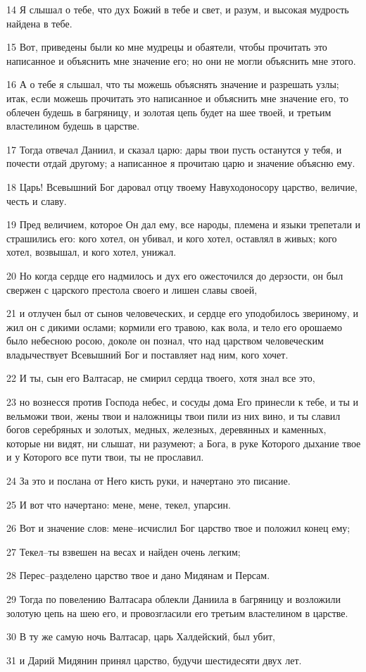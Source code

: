 \par 14 Я слышал о тебе, что дух Божий в тебе и свет, и разум, и высокая мудрость найдена в тебе.
\par 15 Вот, приведены были ко мне мудрецы и обаятели, чтобы прочитать это написанное и объяснить мне значение его; но они не могли объяснить мне этого.
\par 16 А о тебе я слышал, что ты можешь объяснять значение и разрешать узлы; итак, если можешь прочитать это написанное и объяснить мне значение его, то облечен будешь в багряницу, и золотая цепь будет на шее твоей, и третьим властелином будешь в царстве.
\par 17 Тогда отвечал Даниил, и сказал царю: дары твои пусть останутся у тебя, и почести отдай другому; а написанное я прочитаю царю и значение объясню ему.
\par 18 Царь! Всевышний Бог даровал отцу твоему Навуходоносору царство, величие, честь и славу.
\par 19 Пред величием, которое Он дал ему, все народы, племена и языки трепетали и страшились его: кого хотел, он убивал, и кого хотел, оставлял в живых; кого хотел, возвышал, и кого хотел, унижал.
\par 20 Но когда сердце его надмилось и дух его ожесточился до дерзости, он был свержен с царского престола своего и лишен славы своей,
\par 21 и отлучен был от сынов человеческих, и сердце его уподобилось звериному, и жил он с дикими ослами; кормили его травою, как вола, и тело его орошаемо было небесною росою, доколе он познал, что над царством человеческим владычествует Всевышний Бог и поставляет над ним, кого хочет.
\par 22 И ты, сын его Валтасар, не смирил сердца твоего, хотя знал все это,
\par 23 но вознесся против Господа небес, и сосуды дома Его принесли к тебе, и ты и вельможи твои, жены твои и наложницы твои пили из них вино, и ты славил богов серебряных и золотых, медных, железных, деревянных и каменных, которые ни видят, ни слышат, ни разумеют; а Бога, в руке Которого дыхание твое и у Которого все пути твои, ты не прославил.
\par 24 За это и послана от Него кисть руки, и начертано это писание.
\par 25 И вот что начертано: мене, мене, текел, упарсин.
\par 26 Вот и значение слов: мене--исчислил Бог царство твое и положил конец ему;
\par 27 Текел--ты взвешен на весах и найден очень легким;
\par 28 Перес--разделено царство твое и дано Мидянам и Персам.
\par 29 Тогда по повелению Валтасара облекли Даниила в багряницу и возложили золотую цепь на шею его, и провозгласили его третьим властелином в царстве.
\par 30 В ту же самую ночь Валтасар, царь Халдейский, был убит,
\par 31 и Дарий Мидянин принял царство, будучи шестидесяти двух лет.


